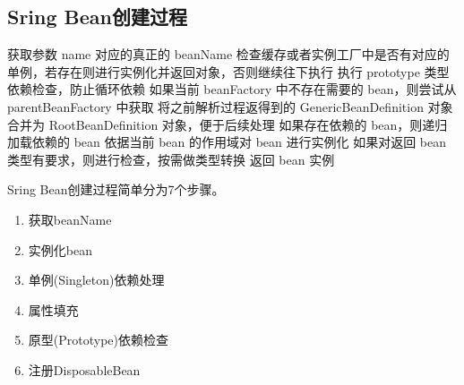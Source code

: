 \documentclass[../../../interview-questions.tex]{subfiles}
\begin{document}
\subsection{Sring Bean创建过程}

获取参数 name 对应的真正的 beanName
检查缓存或者实例工厂中是否有对应的单例，若存在则进行实例化并返回对象，否则继续往下执行
执行 prototype 类型依赖检查，防止循环依赖
如果当前 beanFactory 中不存在需要的 bean，则尝试从 parentBeanFactory 中获取
将之前解析过程返得到的 GenericBeanDefinition 对象合并为 RootBeanDefinition 对象，便于后续处理
如果存在依赖的 bean，则递归加载依赖的 bean
依据当前 bean 的作用域对 bean 进行实例化
如果对返回 bean 类型有要求，则进行检查，按需做类型转换
返回 bean 实例


Sring Bean创建过程简单分为7个步骤。

\begin{enumerate}
\item{获取beanName}
\item{实例化bean}
\item{单例(Singleton)依赖处理}
\item{属性填充}
\item{原型(Prototype)依赖检查}
\item{注册DisposableBean}
\end{enumerate}
\end{document}
